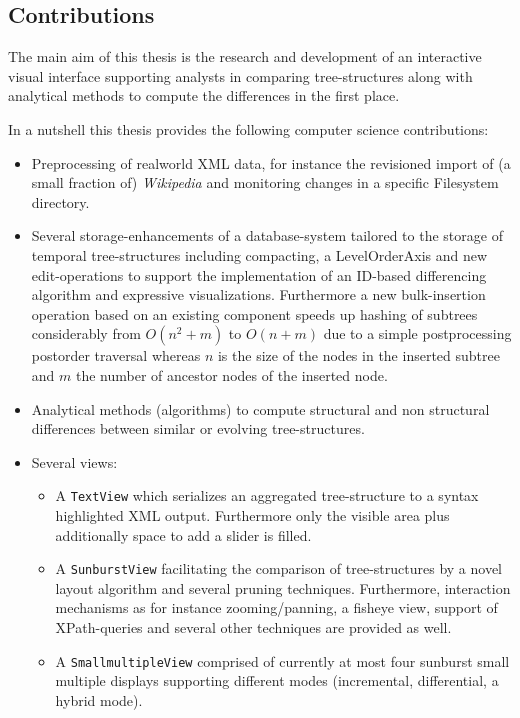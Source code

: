 \subsection{Contributions}
The main aim of this thesis is the research and development of an interactive visual interface supporting analysts in comparing tree-structures along with analytical methods to compute the differences in the first place.

In a nutshell this thesis provides the following computer science contributions:

\begin{itemize}
\item Preprocessing of realworld XML data, for instance the revisioned import of (a small fraction of) \emph{Wikipedia} and monitoring changes in a specific Filesystem directory.
\item Several storage-enhancements of a database-system tailored to the storage of temporal tree-structures including compacting, a LevelOrderAxis and new edit-operations to support the implementation of an ID-based differencing algorithm and expressive visualizations. Furthermore a new bulk-insertion operation based on an existing component speeds up hashing of subtrees considerably from $O(n^2+m)$ to $O(n+m)$ due to a simple postprocessing postorder traversal whereas $n$ is the size of the nodes in the inserted subtree and $m$ the number of ancestor nodes of the inserted node.
\item Analytical methods (algorithms) to compute structural and non structural differences between similar or evolving tree-structures.
\item Several views:
\begin{itemize}
\item A \texttt{TextView} which serializes an aggregated tree-structure to a syntax highlighted XML output. Furthermore only the visible area plus additionally space to add a slider is filled.
\item A \texttt{SunburstView} facilitating the comparison of tree-structures by a novel layout algorithm and several pruning techniques. Furthermore, interaction mechanisms as for instance zooming/panning, a fisheye view, support of XPath-queries and several other techniques are provided as well.
\item A \texttt{SmallmultipleView} comprised of currently at most four sunburst small multiple displays supporting different modes (incremental, differential, a hybrid mode).
\end{itemize}
\end{itemize}

